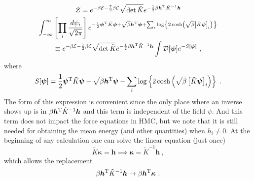 \documentclass[11pt]{article}
\begin{document}
\begin{multline}\label{eqn:Z}
\mathcal{Z}=e^{-\beta\mathcal{E}-\frac{7}{2}\beta\mathcal{C}}\sqrt{\operatorname{det}\tilde K}e^{-\frac{1}{2} \beta \bm h^{\rm T} \tilde{K}^{-1} \bm h}\\
\int_{-\infty}^{\infty}\left[\prod_{i} \frac{d \psi_{i}}{\sqrt{2 \pi}}\right]
e^{-\frac{1}{2}\bm\psi^{\rm T} \tilde K\bm \psi+\sqrt{\beta}\bm h^{\rm T}\bm\psi+\sum_i\log\left\{2\cosh\left(\sqrt{\beta}\left[\tilde{K}\bm \psi\right]_i\right)\right\}}\\
\equiv e^{-\beta\mathcal{E}-\frac{7}{2}\beta\mathcal{C}}\sqrt{\operatorname{det}\tilde K}e^{-\frac{1}{2} \beta \bm h^{\rm T} \tilde{K}^{-1} \bm h}
\int\mathcal{D}[\bm\psi]
e^{-S[\bm\psi]}\ ,
\end{multline}
where
\begin{equation}
S[\bm\psi]=\frac{1}{2}\bm\psi^{\rm T} \tilde K\bm \psi-\sqrt{\beta}\bm h^{\rm T}\bm\psi-\sum_i\log\left\{2\cosh\left(\sqrt{\beta}\left[\tilde{K}\bm \psi\right]_i\right)\right\}\ .
\end{equation}
The form of this expression is convenient since the only place where an inverse shows up is in $\beta \bm h^{\rm T} \tilde{K}^{-1} \bm h$ and this term is independent of the field $\psi$.  And this term does not impact the force equations in HMC, but we note that it is still needed for obtaining the mean energy (and other quantities) when $h_i\ne 0$.  At the beginning of any calculation one can solve the linear equation (just once)
\begin{displaymath}
\tilde K\bm\kappa =\bm h\implies \bm \kappa = \tilde K^{-1}\bm h\ ,
\end{displaymath}
which allows the replacement
\begin{displaymath}
\beta \bm h^{\rm T} \tilde{K}^{-1} \bm h\rightarrow\beta \bm h^{\rm T}\bm \kappa\ .
\end{displaymath}
\end{document}
